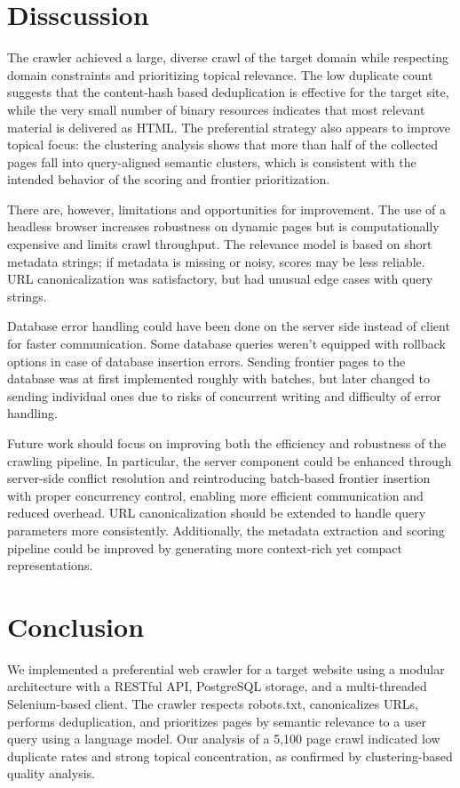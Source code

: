 \documentclass[conference]{IEEEtran}
\begin{document}
\section{Disscussion}
The crawler achieved a large, diverse crawl of the target domain while respecting domain constraints and prioritizing topical relevance. The low duplicate count suggests that the content-hash based deduplication is effective for the target site, while the very small number of binary resources indicates that most relevant material is delivered as HTML. The preferential strategy also appears to improve topical focus: the clustering analysis shows that more than half of the collected pages fall into query-aligned semantic clusters, which is consistent with the intended behavior of the scoring and frontier prioritization.

There are, however, limitations and opportunities for improvement. The use of a headless browser increases robustness on dynamic pages but is computationally expensive and limits crawl throughput. The relevance model is based on short metadata strings; if metadata is missing or noisy, scores may be less reliable. URL canonicalization was satisfactory, but had unusual edge cases with query strings. 

Database error handling could have been done on the server side instead of client for faster communication. Some database queries weren't equipped with rollback options in case of database insertion errors. Sending frontier pages to the database was at first implemented roughly with batches, but later changed to sending individual ones due to risks of concurrent writing and difficulty of error handling.

Future work should focus on improving both the efficiency and robustness of the crawling pipeline. In particular, the server component could be enhanced through server-side conflict resolution and reintroducing batch-based frontier insertion with proper concurrency control, enabling more efficient communication and reduced overhead. URL canonicalization should be extended to handle query parameters more consistently. Additionally, the metadata extraction and scoring pipeline could be improved by generating more context-rich yet compact representations.


\section{Conclusion}
We implemented a preferential web crawler for a target website using a modular architecture with a RESTful API, PostgreSQL storage, and a multi-threaded Selenium-based client. The crawler respects robots.txt, canonicalizes URLs, performs deduplication, and prioritizes pages by semantic relevance to a user query using a language model. Our analysis of a 5,100 page crawl indicated low duplicate rates and strong topical concentration, as confirmed by clustering-based quality analysis.
\end{document}
